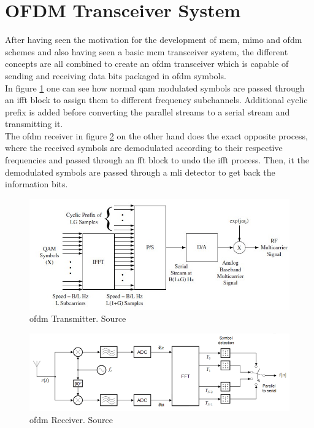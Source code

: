 \section{OFDM Transceiver System}
After having seen the motivation for the development of \acrshort{mcm}, \acrshort{mimo} and \acrshort{ofdm} schemes and also having seen a basic \acrshort{mcm} transceiver system, the different concepts are all combined to create an \acrshort{ofdm} transceiver which is capable of sending and receiving data bits packaged in \acrshort{ofdm} symbols.\\
In figure \ref{fig:ofdm transmitter} one can see how normal \acrshort{qam} modulated symbols are passed through an \acrshort{ifft} block to assign them to different frequency subchannels. Additional cyclic prefix is added before converting the parallel streams to a serial stream and transmitting it.\\
The \acrshort{ofdm} receiver in figure \ref{fig:ofdm receiver} on the other hand does the exact opposite process, where the received symbols are demodulated according to their respective frequencies and passed through an \acrshort{fft} block to undo the \acrshort{ifft} process. Then, it the demodulated symbols are passed through a \acrlong{mli} detector to get back the information bits.\\

\begin{figure}[!htbp]
\centering
\includegraphics[scale=1]{Chapter 2/Figures/OFDM Transmitter}
\caption[\acrshort{ofdm} Transmitter]{\acrshort{ofdm} Transmitter. Source \textcite{Ghosh2010}}
\label{fig:ofdm transmitter}
\end{figure}

\begin{figure}[!htbp]
\centering
\includegraphics[scale=0.6]{Chapter 2/Figures/OFDM Receiver}
\caption[\acrshort{ofdm} Receiver]{\acrshort{ofdm} Receiver. Source \textcite{Ghosh2010}}
\label{fig:ofdm receiver}
\end{figure}


